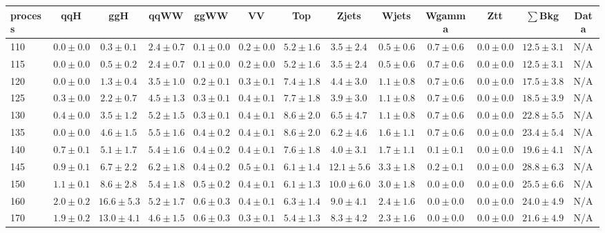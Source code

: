\begin{table}
{%
 \tiny
 \begin{center}
 \begin{tabular}{l | c c | c c c c c c c c  | c c}
 \hline
 process & qqH & ggH & qqWW & ggWW & VV & Top & Zjets & Wjets & Wgamma & Ztt & $\sum$Bkg & Data \\
 \hline
110 & $0.0\pm0.0$ & $0.3\pm0.1$ & $2.4\pm0.7$ & $0.1\pm0.0$ & $0.2\pm0.0$ & $5.2\pm1.6$ & $3.5\pm2.4$ & $0.5\pm0.6$ & $0.7\pm0.6$ & $0.0\pm0.0$ & $12.5\pm3.1$ & N/A \\
115 & $0.0\pm0.0$ & $0.5\pm0.2$ & $2.4\pm0.7$ & $0.1\pm0.0$ & $0.2\pm0.0$ & $5.2\pm1.6$ & $3.5\pm2.4$ & $0.5\pm0.6$ & $0.7\pm0.6$ & $0.0\pm0.0$ & $12.5\pm3.1$ & N/A \\
120 & $0.0\pm0.0$ & $1.3\pm0.4$ & $3.5\pm1.0$ & $0.2\pm0.1$ & $0.3\pm0.1$ & $7.4\pm1.8$ & $4.4\pm3.0$ & $1.1\pm0.8$ & $0.7\pm0.6$ & $0.0\pm0.0$ & $17.5\pm3.8$ & N/A \\
125 & $0.3\pm0.0$ & $2.2\pm0.7$ & $4.5\pm1.3$ & $0.3\pm0.1$ & $0.4\pm0.1$ & $7.7\pm1.8$ & $3.9\pm3.0$ & $1.1\pm0.8$ & $0.7\pm0.6$ & $0.0\pm0.0$ & $18.5\pm3.9$ & N/A \\
130 & $0.4\pm0.0$ & $3.5\pm1.2$ & $5.2\pm1.5$ & $0.3\pm0.1$ & $0.4\pm0.1$ & $8.6\pm2.0$ & $6.5\pm4.7$ & $1.1\pm0.8$ & $0.7\pm0.6$ & $0.0\pm0.0$ & $22.8\pm5.5$ & N/A \\
135 & $0.0\pm0.0$ & $4.6\pm1.5$ & $5.5\pm1.6$ & $0.4\pm0.2$ & $0.4\pm0.1$ & $8.6\pm2.0$ & $6.2\pm4.6$ & $1.6\pm1.1$ & $0.7\pm0.6$ & $0.0\pm0.0$ & $23.4\pm5.4$ & N/A \\
140 & $0.7\pm0.1$ & $5.1\pm1.7$ & $5.4\pm1.6$ & $0.4\pm0.2$ & $0.4\pm0.1$ & $7.6\pm1.8$ & $4.0\pm3.1$ & $1.7\pm1.1$ & $0.1\pm0.1$ & $0.0\pm0.0$ & $19.6\pm4.1$ & N/A \\
145 & $0.9\pm0.1$ & $6.7\pm2.2$ & $6.2\pm1.8$ & $0.4\pm0.2$ & $0.5\pm0.1$ & $6.1\pm1.4$ & $12.1\pm5.6$ & $3.3\pm1.8$ & $0.2\pm0.1$ & $0.0\pm0.0$ & $28.8\pm6.3$ & N/A \\
150 & $1.1\pm0.1$ & $8.6\pm2.8$ & $5.4\pm1.8$ & $0.5\pm0.2$ & $0.4\pm0.1$ & $6.1\pm1.3$ & $10.0\pm6.0$ & $3.0\pm1.8$ & $0.0\pm0.0$ & $0.0\pm0.0$ & $25.5\pm6.6$ & N/A \\
160 & $2.0\pm0.2$ & $16.6\pm5.3$ & $5.2\pm1.7$ & $0.6\pm0.3$ & $0.4\pm0.1$ & $6.3\pm1.4$ & $9.0\pm4.1$ & $2.4\pm1.6$ & $0.0\pm0.0$ & $0.0\pm0.0$ & $24.0\pm4.9$ & N/A \\
170 & $1.9\pm0.2$ & $13.0\pm4.1$ & $4.6\pm1.5$ & $0.6\pm0.3$ & $0.3\pm0.1$ & $5.4\pm1.3$ & $8.3\pm4.2$ & $2.3\pm1.6$ & $0.0\pm0.0$ & $0.0\pm0.0$ & $21.6\pm4.9$ & N/A \\

\end{tabular}
\end{center}}
\end{table}
